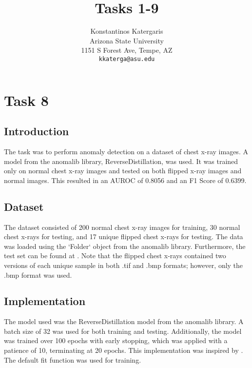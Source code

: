 \documentclass[10pt,twocolumn,letterpaper]{article}
\begin{document}
\title{Tasks 1-9}

\author{Konstantinos Katergaris\\
Arizona State University\\
1151 S Forest Ave, Tempe, AZ\\
{\tt\small kkaterga@asu.edu}}


\maketitle

\section{Task 8}
\subsection{Introduction}
The task was to perform anomaly detection on a dataset of chest x-ray images. A model from the anomalib library, ReverseDistillation, was used. It was trained only on normal chest x-ray images and tested on both flipped x-ray images and normal images. This resulted in an AUROC of 0.8056 and an F1 Score of 0.6399.

\subsection{Dataset}
The dataset consisted of 200 normal chest x-ray images for training, 30 normal chest x-rays for testing, and 17 unique flipped chest x-rays for testing. The data was loaded using the `Folder` object from the anomalib library. Furthermore, the test set can be found at \cite{DatasetForClass}. Note that the flipped chest x-rays contained two versions of each unique sample in both .tif and .bmp formats; however, only the .bmp format was used.

\subsection{Implementation}
The model used was the ReverseDistillation model from the anomalib library. A batch size of 32 was used for both training and testing. Additionally, the model was trained over 100 epochs with early stopping, which was applied with a patience of 10, terminating at 20 epochs. This implementation was inspired by \cite{randellini2023anomalib}. The default fit function was used for training.
\end{document}
